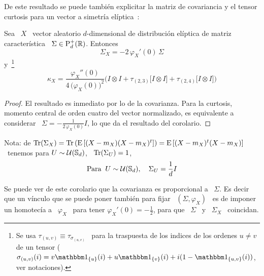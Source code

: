 De este  resultado se puede tambi\'en  explicitar la matriz de  covariancia y el
tensor curtosis para un vector a simetr\'ia el\'iptica~\cite[p.~44]{FanKot90}:
%
\begin{corolario}
\label{Cor:MP:MediaCovarianzaEliptica}
%
  Sea \ $X$  \ vector aleatorio $d$-dimensional de  distribuci\'on el\'iptica de
  matriz caracter\'istica \ $\Sigma \in \mathrm{P}_d^+(\mathbb{R})$. Entonces
  \[
  \Sigma_X = - 2 \,  \varphi_X'(0) \, \Sigma
  \]
  y~\footnote{Se usa $\tau_{(u,v)}  \equiv \tau_{\sigma_{(u,v)}}$  \  para la
  traspuesta  de  los   indices  de  los  ordenes  $u  \ne   v$  de  un  tensor
  ($\sigma_{(u,v)}(i)   =   v   \un_{\{u\}}(i)    +   u   \un_{\{v\}}(i)   +   i
  (1-\un_{\{u,v\}}(i))$, ver notaciones).}
  \[
  \kappa_X  = \frac{\varphi_X''(0)}{4  \,  \big( \varphi_X(0)  \big)^2} \Big(  I
  \otimes I + \tau_{(2,3)}\big[ I  \otimes I \big] + \tau_{(2,4)}\big[ I \otimes
  I \big] \Big)
  \]
\end{corolario}
\begin{proof}
  El resultado es inmediato por lo  de la covarianza.  Para la curtosis, momento
  central de orden cuatro del  vector normalizado, es equivalente a considerar \
  $\Sigma  = -  \frac{1}{2  \, \varphi_X(0)}  I$,  lo que  da  el resultado  del
  corolario.
\end{proof}
%
Nota: de $\operatorname{Tr}(\Sigma_X) = \operatorname{Tr}\left( \operatorname{E}\left[ (X-m_X) (X-m_X)^t \right] \right)
= \operatorname{E}\left[ (X-m_X)^t  (X-m_X) \right]$ \ tenemos para  $U \sim \mathcal{U}(\mathbb{S}_d)$, \
$\operatorname{Tr}(\Sigma_U) = 1$, \ie
%
\[
\mbox{Para } \: U \sim \mathcal{U}(\mathbb{S}_d), \quad \Sigma_U = \frac{1}{d} I
\]

Se  puede  ver  de  este  corolario  que  la  covarianza  es  proporcional  a  \
$\Sigma$. Es decir que un v\'inculo que se puede poner tambi\'en para fijar \ $(
\Sigma ,  \varphi_X )$ \  es de  imponer un homotec\'ia  a \ $\varphi_X$  \ para
tener  $\varphi_X'(0) =  - \frac12$,  para que  \ $\Sigma$  \ y  \  $\Sigma_X$ \
coincidan.

